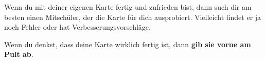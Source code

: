 \documentclass[12pt,a5paper,landscape]{scrartcl}
\begin{document}
	\leereKarte
		
	\begin{loesungskarte}
		Wenn du mit deiner eigenen Karte fertig und zufrieden bist, dann such dir am besten einen Mitschüler, der die Karte für dich ausprobiert. Vielleicht findet er ja noch Fehler oder hat Verbesserungsvorschläge.
		
		\bigskip
		Wenn du denkst, dass deine Karte wirklich fertig ist, dann \textbf{gib sie vorne am Pult ab}.
	\end{loesungskarte}
	
\end{document}
